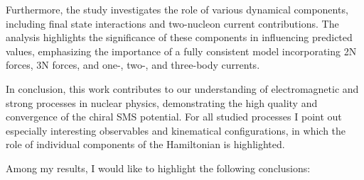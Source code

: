 \documentclass[a4paper, 14pt]{extarticle}
\begin{document}
Furthermore, the study investigates the role of various dynamical components, including final state interactions and two-nucleon current contributions. The analysis highlights the significance of these components in influencing predicted values, emphasizing the importance of a fully consistent model incorporating 2N forces, 3N forces, and one-, two-, and three-body currents.

In conclusion, this work contributes to our understanding of electromagnetic and strong processes in nuclear physics, demonstrating the high quality and convergence of the chiral SMS potential.
For all studied processes I point out especially interesting observables and kinematical configurations, in which the role of individual components of the Hamiltonian is highlighted.


Among my results, I would like to highlight the following 
conclusions:
\end{document}
